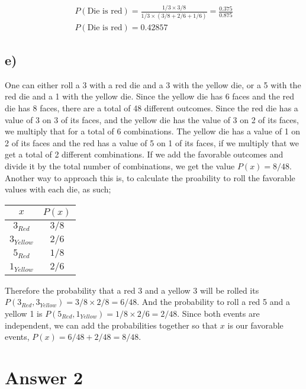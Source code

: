 \documentclass[12pt]{article}
\begin{document}
\begin{align*}
    P(\text{Die is red}) = \frac{1/3 \times 3/8}{1/3 \times (3/8 + 2/6 + 1/6)} = \frac{0.375}{0.875} \\
    P(\text{Die is red}) = 0.42857
\end{align*}

\subsection*{e)}
One can either roll a 3 with a red die and a 3 with the yellow die, or a 
5 with the red die and a 1 with the yellow die. Since the yellow die has 6
faces and the red die has 8 faces, there are a total of 48 different outcomes.
Since the red die has a value of 3 on 3 of its faces, and the yellow die
has the value of 3 on 2 of its faces, we multiply that for a total of 6 
combinations. The yellow die has a value of 1 on 2 of its faces and the red
has a value of 5 on 1 of its faces, if we multiply that we get a total of
2 different combinations. If we add the favorable outcomes and divide it 
by the total number of combinations, we get the value $P(x) = 8/48$.
\newline
\newline
Another way to approach this is, to calculate the proability to roll the favorable
values with each die, as such;

\begin{center}
    \begin{tabular}{ c | c }
        $x$ & $P(x)$  \\ 
        \hline
        $3_{Red}$       & $3/8$     \\
        $3_{Yellow}$    & $2/6$     \\
        $5_{Red}$       & $1/8$     \\
        $1_{Yellow}$    & $2/6$     \\
    \end{tabular}
\end{center}

Therefore the probability that a red 3 and a yellow 3 will be rolled its
$P(3_{Red},3_{Yellow}) = 3/8 \times 2/8 = 6/48$. And the probability to roll
a red 5 and a yellow 1 is $P(5_{Red}, 1_{Yellow}) = 1/8 \times 2/6 = 2/48$.
Since both events are independent, we can add the probabilities together so 
that $x$ is our favorable events, $P(x) = 6/48 + 2/48 = 8/48$.

\section*{Answer 2}
\end{document}
